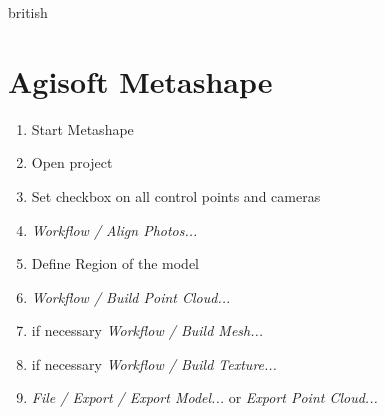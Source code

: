 \documentclass[./00PhotoBox.tex]{subfiles}
\begin{document}
\begin{otherlanguage*}{british}
    \section{Agisoft Metashape}
    \begin{enumerate}
        \item Start Metashape
        \item Open project
        \item Set checkbox on all control points and cameras
        \item \textit{Workflow / Align Photos...}
        \item Define Region of the model
        \item \textit{Workflow / Build Point Cloud...}
        \item if necessary \textit{Workflow / Build Mesh...}
        \item if necessary \textit{Workflow / Build Texture...}
        \item \textit{File / Export / Export Model...} or \textit{Export Point Cloud...}
    \end{enumerate}

\end{otherlanguage*}
\biblio
\end{document}
